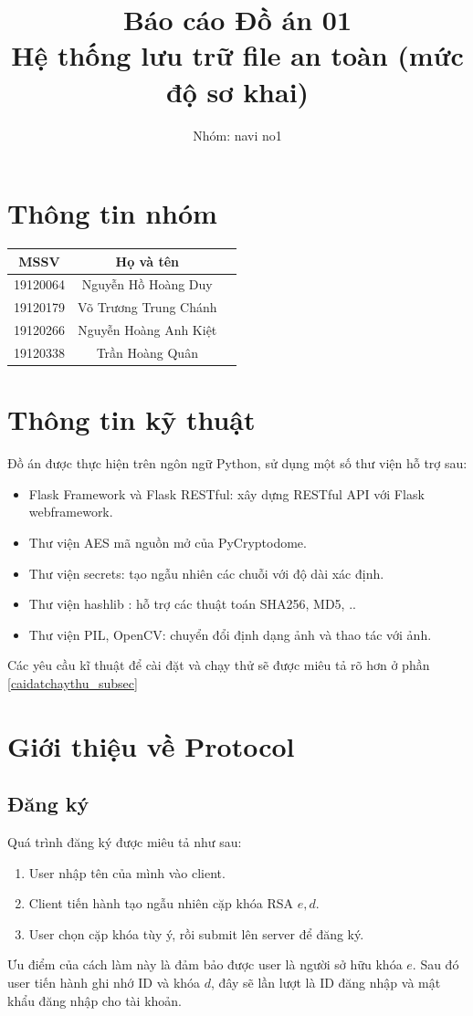 \documentclass[12pt]{article}
\title{
	Báo cáo Đồ án 01\\ 
	Hệ thống lưu trữ file an toàn (mức độ sơ khai)
}
\author{Nhóm: navi no1}
\begin{document}
\maketitle
\tableofcontents
\pagebreak

\section{Thông tin nhóm}
\begin{center}
\begin{tabular}{ | c | c | c | } 
    \hline
    MSSV & Họ và tên\\
    \hline
    19120064 & Nguyễn Hồ Hoàng Duy\\
    \hline
    19120179 & Võ Trương Trung Chánh\\
    \hline
    19120266 & Nguyễn Hoàng Anh Kiệt\\
    \hline
    19120338 & Trần Hoàng Quân\\
    \hline
\end{tabular}
\end{center}

\section{Thông tin kỹ thuật}
Đồ án được thực hiện trên ngôn ngữ Python, sử dụng một số thư viện hỗ trợ sau:
\begin{itemize}
    \item Flask Framework và Flask RESTful: xây dựng RESTful API với Flask webframework.
    \item Thư viện AES mã nguồn mở của PyCryptodome.
    \item Thư viện secrets: tạo ngẫu nhiên các chuỗi với độ dài xác định.
    \item Thư viện hashlib : hỗ trợ các thuật toán SHA256, MD5, ..
    \item Thư viện PIL, OpenCV: chuyển đổi định dạng ảnh và thao tác với ảnh.
\end{itemize}
Các yêu cầu kĩ thuật để cài đặt và chạy thử sẽ được miêu tả rõ hơn ở phần \ref{caidatchaythu_subsec} 

\section{Giới thiệu về Protocol}
\subsection{Đăng ký}
Quá trình đăng ký được miêu tả như sau:
\begin{enumerate}
\item User nhập tên của mình vào client.
\item Client tiến hành tạo ngẫu nhiên cặp khóa RSA $e, d$.
\item User chọn cặp khóa tùy ý, rồi submit lên server để đăng ký.
\end{enumerate}
Ưu điểm của cách làm này là đảm bảo được user là người sở hữu khóa $e$. Sau đó user tiến hành ghi nhớ ID và khóa $d$, đây sẽ lần lượt là ID đăng nhập và mật khẩu đăng nhập cho tài khoản.
\end{document}
